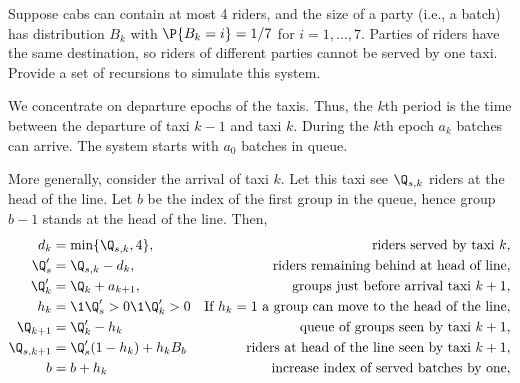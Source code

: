 \begin{exercise}\label{ex:l-219}
 Suppose
cabs can contain at most 4 riders, and the size of a party (i.e., a batch) has distribution $B_k$ with $\P{B_k= i} = 1/7$ for $i=1,\ldots, 7$.
Parties of riders have the same destination, so riders of different parties cannot be served by one taxi.
Provide a set of recursions to simulate this system.

\begin{solution}
 We concentrate on departure epochs of the taxis.
 Thus, the $k$th period is the time between the departure of taxi $k-1$ and taxi $k$.
 During the $k$th epoch $a_k$ batches can arrive.
 The system starts with $a_0$ batches in queue.


 More generally, consider the arrival of taxi $k$. Let this taxi see $\Q_{s,k}$  riders at the head of the line. Let $b$ be the index of the first group in the queue, hence group $b-1$ stands at the head of the line. Then,
\begin{align*}
d_k &= \min\{\Q_{s,k}, 4\}, &\text{riders served by taxi $k$}, \\
\Q_{s}' &= \Q_{s,k} - d_k, &\text{riders remaining behind at head of line}, \\
\Q_k' &= \Q_k + a_{k+1}, &\text{groups just before arrival taxi $k+1$}, \\
h_k &= \1{\Q_s'>0}\1{\Q_k'>0} & \text{If $h_k=1$ a group can move to the head of the line}, \\
\Q_{k+1} &= \Q_k' - h_k& \text{queue of groups seen by taxi $k+1$}, \\
\Q_{s, k+1} &= \Q_{s}'(1-h_k) + h_k B_b& \text{riders at head of the line seen by taxi $k+1$}, \\
b &= b + h_k & \text{increase index of served batches by one}, \\
\end{align*}

\end{solution}

\end{exercise}







